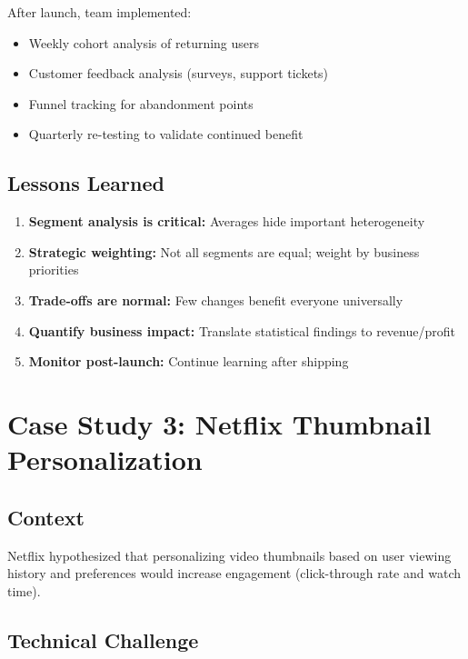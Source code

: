 After launch, team implemented:
\begin{itemize}
    \item Weekly cohort analysis of returning users
    \item Customer feedback analysis (surveys, support tickets)
    \item Funnel tracking for abandonment points
    \item Quarterly re-testing to validate continued benefit
\end{itemize}

\subsection{Lessons Learned}

\begin{enumerate}
    \item \textbf{Segment analysis is critical:} Averages hide important heterogeneity

    \item \textbf{Strategic weighting:} Not all segments are equal; weight by business priorities

    \item \textbf{Trade-offs are normal:} Few changes benefit everyone universally

    \item \textbf{Quantify business impact:} Translate statistical findings to revenue/profit

    \item \textbf{Monitor post-launch:} Continue learning after shipping
\end{enumerate}

\section{Case Study 3: Netflix Thumbnail Personalization}

\subsection{Context}

Netflix hypothesized that personalizing video thumbnails based on user viewing history and preferences would increase engagement (click-through rate and watch time).

\subsection{Technical Challenge}

